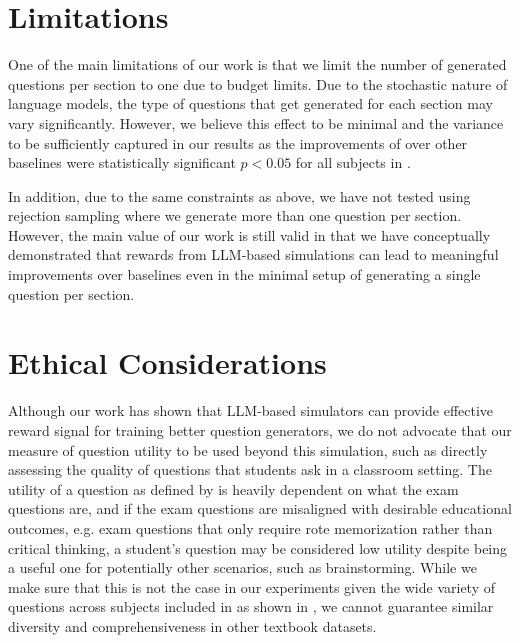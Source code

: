 \section*{Limitations}

One of the main limitations of our work is that we limit the number of generated questions per section to one due to budget limits. 
Due to the stochastic nature of language models, the type of questions that get generated for each section may vary significantly. 
However, we believe this effect to be minimal and the variance to be sufficiently captured in our results as the improvements of \ours over other baselines were statistically significant $p<0.05$ for all subjects in \ourdata. 

In addition, due to the same constraints as above, we have not tested \ours using rejection sampling where we generate more than one question per section. 
However, the main value of our work is still valid in that we have conceptually demonstrated that rewards from LLM-based simulations can lead to meaningful improvements over baselines even in the minimal setup of generating a single question per section. 

\section*{Ethical Considerations}

Although our work has shown that LLM-based simulators can provide effective reward signal for training better question generators, we do not advocate that our measure of question utility to be used beyond this simulation, such as directly assessing the quality of questions that students ask in a classroom setting. 
The utility of a question as defined by \ours is heavily dependent on what the exam questions are, and if the exam questions are misaligned with desirable educational outcomes, e.g. exam questions that only require rote memorization rather than critical thinking, a student's question may be considered low utility despite being a useful one for potentially other scenarios, such as brainstorming.
While we make sure that this is not the case in our experiments given the wide variety of questions across subjects included in \ourdata as shown in , we cannot guarantee similar diversity and comprehensiveness in other textbook datasets. 






